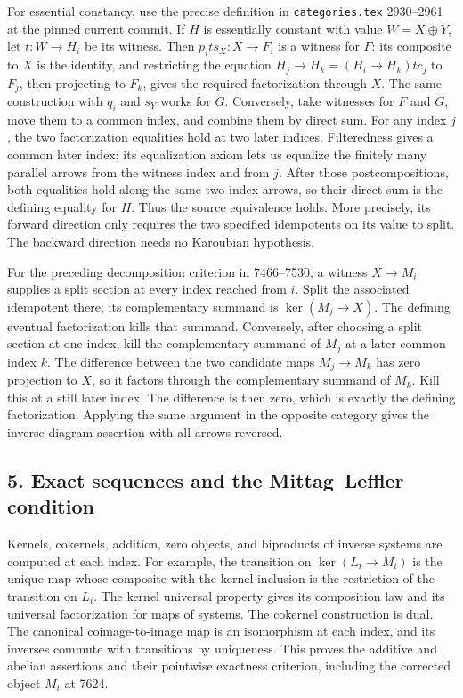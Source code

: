 For essential constancy, use the precise definition in \texttt{categories.tex} 2930--2961 at the pinned current commit. If \(H\) is essentially constant with value \(W=X\oplus Y\), let \(t:W\to H_i\) be its witness. Then \(p_i t s_X:X\to F_i\) is a witness for \(F\): its composite to \(X\) is the identity, and restricting the equation \(H_j\to H_k=(H_i\to H_k)t c_j\) to \(F_j\), then projecting to \(F_k\), gives the required factorization through \(X\). The same construction with \(q_i\) and \(s_Y\) works for \(G\). Conversely, take witnesses for \(F\) and \(G\), move them to a common index, and combine them by direct sum. For any index \(j\), the two factorization equalities hold at two later indices. Filteredness gives a common later index; its equalization axiom lets us equalize the finitely many parallel arrows from the witness index and from \(j\). After those postcompositions, both equalities hold along the same two index arrows, so their direct sum is the defining equality for \(H\). Thus the source equivalence holds. More precisely, its forward direction only requires the two specified idempotents on its value to split. The backward direction needs no Karoubian hypothesis.

For the preceding decomposition criterion in 7466--7530, a witness \(X\to M_i\) supplies a split section at every index reached from \(i\). Split the associated idempotent there; its complementary summand is \(\ker(M_j\to X)\). The defining eventual factorization kills that summand. Conversely, after choosing a split section at one index, kill the complementary summand of \(M_j\) at a later common index \(k\). The difference between the two candidate maps \(M_j\to M_k\) has zero projection to \(X\), so it factors through the complementary summand of \(M_k\). Kill this at a still later index. The difference is then zero, which is exactly the defining factorization. Applying the same argument in the opposite category gives the inverse-diagram assertion with all arrows reversed.

\subsection{5. Exact sequences and the Mittag--Leffler condition}\label{note-09-exact-sequences-and-the-mittagleffler-condition}

Kernels, cokernels, addition, zero objects, and biproducts of inverse systems are computed at each index. For example, the transition on \(\ker(L_i\to M_i)\) is the unique map whose composite with the kernel inclusion is the restriction of the transition on \(L_i\). The kernel universal property gives its composition law and its universal factorization for maps of systems. The cokernel construction is dual. The canonical coimage-to-image map is an isomorphism at each index, and its inverses commute with transitions by uniqueness. This proves the additive and abelian assertions and their pointwise exactness criterion, including the corrected object \(M_i\) at 7624.

